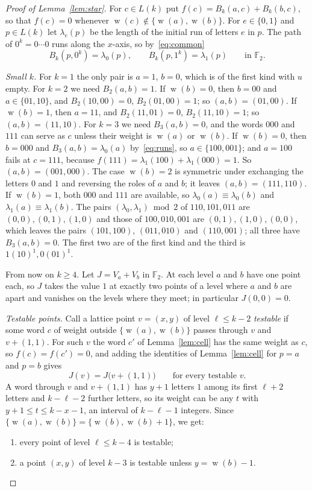 \documentclass[11pt]{amsart}
\theoremstyle{definition}
\theoremstyle{remark}
\numberwithin{equation}{section}
\newcommand{\F}{\mathbb{F}}
\DeclareMathOperator{\wt}{w}
\begin{document}
\begin{proof}[Proof of Lemma~\ref{lem:star}]
For $c\in L(k)$ put $f(c)=B_k(a,c)+B_k(b,c)$, so that $f(c)=0$ whenever $\wt(c)\notin\{\wt(a),\wt(b)\}$. For $e\in\{0,1\}$ and $p\in L(k)$ let $\lambda_e(p)$ be the length of the initial run of letters $e$ in $p$. The path of $0^k=0\cdots0$ runs along the $x$-axis, so by~\eqref{eq:common}
\begin{equation}\label{eq:runs}
B_k(p,0^k)=\lambda_0(p),\qquad B_k(p,1^k)=\lambda_1(p)\qquad\text{in }\F_2 .
\end{equation}

\emph{Small $k$.} For $k=1$ the only pair is $a=1$, $b=0$, which is of the first kind with $u$ empty. For $k=2$ we need $B_2(a,b)=1$. If $\wt(b)=0$, then $b=00$ and $a\in\{01,10\}$, and $B_2(10,00)=0$, $B_2(01,00)=1$; so $(a,b)=(01,00)$. If $\wt(b)=1$, then $a=11$, and $B_2(11,01)=0$, $B_2(11,10)=1$; so $(a,b)=(11,10)$. For $k=3$ we need $B_3(a,b)=0$, and the words $000$ and $111$ can serve as $c$ unless their weight is $\wt(a)$ or $\wt(b)$. If $\wt(b)=0$, then $b=000$ and $B_3(a,b)=\lambda_0(a)$ by~\eqref{eq:runs}, so $a\in\{100,001\}$; and $a=100$ fails at $c=111$, because $f(111)=\lambda_1(100)+\lambda_1(000)=1$. So $(a,b)=(001,000)$. The case $\wt(b)=2$ is symmetric under exchanging the letters $0$ and $1$ and reversing the roles of $a$ and $b$; it leaves $(a,b)=(111,110)$. If $\wt(b)=1$, both $000$ and $111$ are available, so $\lambda_0(a)\equiv\lambda_0(b)$ and $\lambda_1(a)\equiv\lambda_1(b)$. The pairs $(\lambda_0,\lambda_1)\bmod 2$ of $110,101,011$ are $(0,0),(0,1),(1,0)$ and those of $100,010,001$ are $(0,1),(1,0),(0,0)$, which leaves the pairs $(101,100)$, $(011,010)$ and $(110,001)$; all three have $B_3(a,b)=0$. The first two are of the first kind and the third is $1(10)^1,0(01)^1$.

From now on $k\ge4$. Let $J=V_a+V_b$ in $\F_2$. At each level $a$ and $b$ have one point each, so $J$ takes the value $1$ at exactly two points of a level where $a$ and $b$ are apart and vanishes on the levels where they meet; in particular $J(0,0)=0$.

\emph{Testable points.} Call a lattice point $v=(x,y)$ of level $\ell\le k-2$ \emph{testable} if some word $c$ of weight outside $\{\wt(a),\wt(b)\}$ passes through $v$ and $v+(1,1)$. For such $v$ the word $c'$ of Lemma~\ref{lem:cell} has the same weight as $c$, so $f(c)=f(c')=0$, and adding the identities of Lemma~\ref{lem:cell} for $p=a$ and $p=b$ gives
\begin{equation}\label{eq:diag}
J(v)=J\bigl(v+(1,1)\bigr)\qquad\text{for every testable }v .
\end{equation}
A word through $v$ and $v+(1,1)$ has $y+1$ letters $1$ among its first $\ell+2$ letters and $k-\ell-2$ further letters, so its weight can be any $t$ with $y+1\le t\le k-x-1$, an interval of $k-\ell-1$ integers. Since $\{\wt(a),\wt(b)\}=\{\wt(b),\wt(b)+1\}$, we get:
\begin{enumerate}[label=\textup{(T\arabic*)}]
\item every point of level $\ell\le k-4$ is testable;
\item a point $(x,y)$ of level $k-3$ is testable unless $y=\wt(b)-1$.
\end{enumerate}


\end{proof}
\end{document}
